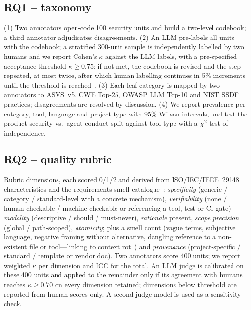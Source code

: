 \documentclass[10pt,conference]{IEEEtran}
\begin{document}
\subsection{RQ1 -- taxonomy}
(1) Two annotators open-code 100 security units and build a two-level codebook; a third annotator adjudicates disagreements. (2) An LLM pre-labels all units with the codebook; a stratified 300-unit sample is independently labelled by two humans and we report Cohen's $\kappa$ against the LLM labels, with a pre-specified acceptance threshold $\kappa\geq0.75$; if not met, the codebook is revised and the step repeated, at most twice, after which human labelling continues in 5\% increments until the threshold is reached~\cite{hennig2023privacy}. (3) Each leaf category is mapped by two annotators to ASVS~v5, CWE Top-25, OWASP LLM Top-10 and NIST SSDF practices; disagreements are resolved by discussion. (4) We report prevalence per category, tool, language and project type with 95\% Wilson intervals, and test the product-security vs.\ agent-conduct split against tool type with a $\chi^2$ test of independence.

\subsection{RQ2 -- quality rubric}
Rubric dimensions, each scored 0/1/2 and derived from ISO/IEC/IEEE~29148 characteristics and the requirements-smell catalogue~\cite{femmer2017smells}: \emph{specificity} (generic / category / standard-level with a concrete mechanism), \emph{verifiability} (none / human-checkable / machine-checkable or referencing a tool, test or CI gate), \emph{modality} (descriptive / should / must-never), \emph{rationale} present, \emph{scope precision} (global / path-scoped), \emph{atomicity}; plus a smell count (vague terms, subjective language, negative framing without alternative, dangling reference to a non-existent file or tool---linking to context rot~\cite{treude2026contextrot}) and \emph{provenance} (project-specific / standard / template or vendor doc). Two annotators score 400 units; we report weighted $\kappa$ per dimension and ICC for the total. An LLM judge is calibrated on these 400 units and applied to the remainder only if its agreement with humans reaches $\kappa\geq0.70$ on every dimension retained; dimensions below threshold are reported from human scores only. A second judge model is used as a sensitivity check.
\end{document}
